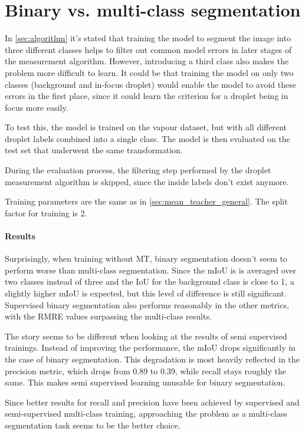 \section{Binary vs. multi-class segmentation}
\label{sec:binary}

In \ref{sec:algorithm} it's stated that training the model to segment the image into three different classes helps to filter out common model errors in later stages of the measurement algorithm. 
However, introducing a third class also makes the problem more difficult to learn. It could be that training the model on only two classes (background and in-focus droplet) would enable the model to avoid these errors in the first place, since it could learn the criterion for a droplet being in focus more easily.

To test this, the model is trained on the vapour dataset, but with all different droplet labels combined into a single class. The model is then evaluated on the test set that underwent the same transformation. 

During the evaluation process, the filtering step performed by the droplet measurement algorithm is skipped, since the inside labels don't exist anymore. 

Training parameters are the same as in \ref{sec:mean_teacher_general}. The split factor for training is 2.

\paragraph{Results}

Surprisingly, when training without MT, binary segmentation doesn't seem to perform worse than multi-class segmentation.
Since the mIoU is is averaged over two classes instead of three and the IoU for the background class is close to 1, a slightly higher mIoU is expected, but this level of difference is still significant. 
Supervised binary segmentation also performs reasonably in the other metrics, with the RMRE values surpassing the multi-class results.

The story seems to be different when looking at the results of semi supervised trainings. 
Instead of improving the performance, the mIoU drops significantly in the case of binary segmentation.
This degradation is most heavily reflected in the precision metric, which drops from 0.89 to 0.39, while recall stays roughly the same.
This makes semi supervised learning unusable for binary segmentation.

Since better results for recall and precision have been achieved by supervised and semi-supervised multi-class training, approaching the problem as a multi-class segmentation task seems to be the better choice.

